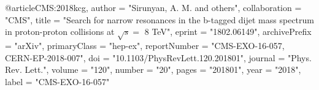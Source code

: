 @article{CMS:2018kcg,
    author = "Sirunyan, A. M. and others",
    collaboration = "CMS",
    title = "{Search for narrow resonances in the b-tagged dijet mass spectrum in proton-proton collisions at $\sqrt{s} =$ 8 TeV}",
    eprint = "1802.06149",
    archivePrefix = "arXiv",
    primaryClass = "hep-ex",
    reportNumber = "CMS-EXO-16-057, CERN-EP-2018-007",
    doi = "10.1103/PhysRevLett.120.201801",
    journal = "Phys. Rev. Lett.",
    volume = "120",
    number = "20",
    pages = "201801",
    year = "2018",
    label = "CMS-EXO-16-057"
}

